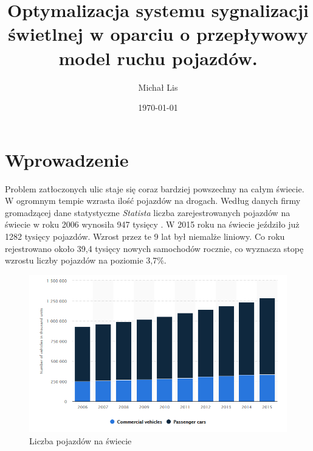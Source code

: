 \documentclass[12pt]{book}
\theoremstyle{plain}
\begin{document}
\title{Optymalizacja  systemu sygnalizacji świetlnej w 
oparciu o przepływowy model ruchu pojazdów.}
\author{Michał Lis}
\date{\today}
\maketitle
\tableofcontents
\chapter{Wprowadzenie}
Problem zatłoczonych ulic staje się coraz bardziej powszechny na całym świecie. W ogromnym tempie wzrasta ilość pojazdów na drogach.
Według danych firmy gromadzącej dane statystyczne \textit{Statista} liczba zarejestrowanych pojazdów na świecie w roku 2006 wynosiła 947 tysięcy \cite{liczbaPojazdowSwiat}. W 2015 roku na świecie jeździło już 1282 tysięcy pojazdów. Wzrost przez te 9 lat był niemalże liniowy. Co roku rejestrowano około 39,4 tysięcy nowych samochodów rocznie, co wyznacza stopę wzrostu liczby pojazdów na poziomie 3,7$\%$.
\begin{figure}[H]
  \centering
    \includegraphics[width=14cm]{liczbaPojazdowSwiat}
 \caption{Liczba pojazdów na świecie}
 \label{fig:liczbaPojazdowSwiat}
\end{figure} \noindent
\end{document}
